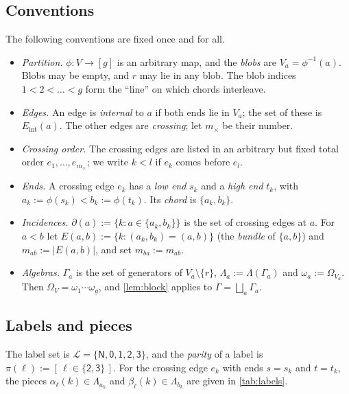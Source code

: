 \documentclass[11pt]{amsart}
\theoremstyle{plain}
\theoremstyle{definition}
\theoremstyle{remark}
\numberwithin{equation}{section}
\newcommand{\cL}{\mathcal{L}}
\newcommand{\lab}[1]{\mathsf{#1}}
\newcommand{\Eint}{E_{\mathrm{int}}}
\newcommand{\mx}{m_{\times}}
\newcommand{\Ind}[1]{[\,#1\,]}
\begin{document}
\subsection{Conventions}
The following conventions are fixed once and for all.
\begin{itemize}
\item \emph{Partition.} $\phi\colon V\to[g]$ is an arbitrary map, and the \emph{blobs} are
$V_a=\phi^{-1}(a)$. Blobs may be empty, and $r$ may lie in any blob. The blob indices
$1<2<\dots<g$ form the ``line'' on which chords interleave.
\item \emph{Edges.} An edge is \emph{internal} to $a$ if both ends lie in $V_a$; the set of these
is $\Eint(a)$. The other edges are \emph{crossing}; let $\mx$ be their number.
\item \emph{Crossing order.} The crossing edges are listed in an arbitrary but fixed total order
$e_1,\dots,e_{\mx}$; we write $k<l$ if $e_k$ comes before $e_l$.
\item \emph{Ends.} A crossing edge $e_k$ has a \emph{low end} $s_k$ and a \emph{high end} $t_k$,
with $a_k:=\phi(s_k)<b_k:=\phi(t_k)$. Its \emph{chord} is $\{a_k,b_k\}$.
\item \emph{Incidences.} $\partial(a):=\{k : a\in\{a_k,b_k\}\}$ is the set of crossing edges at
$a$. For $a<b$ let $E(a,b):=\{k : (a_k,b_k)=(a,b)\}$ (the \emph{bundle} of $\{a,b\}$) and
$m_{ab}:=|E(a,b)|$, and set $m_{ba}:=m_{ab}$.
\item \emph{Algebras.} $\Gamma_a$ is the set of generators of $V_a\setminus\{r\}$,
$\Lambda_a:=\Lambda(\Gamma_a)$ and $\omega_a:=\Omega_{V_a}$. Then $\Omega_V=\omega_1\cdots\omega_g$,
and \cref{lem:block} applies to $\Gamma=\bigsqcup_a\Gamma_a$.
\end{itemize}

\subsection{Labels and pieces}
The label set is $\cL=\{\lab N,\lab 0,\lab 1,\lab 2,\lab 3\}$, and the \emph{parity} of a label is
$\pi(\ell):=\Ind{\ell\in\{\lab 2,\lab 3\}}$. For the crossing edge $e_k$ with ends $s=s_k$ and
$t=t_k$, the pieces $\alpha_\ell(k)\in\Lambda_{a_k}$ and $\beta_\ell(k)\in\Lambda_{b_k}$ are given
in \cref{tab:labels}.
\end{document}
